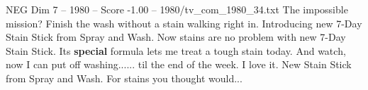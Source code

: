 \begin{textsample}{NEG Dim 7 – 1980 – Score -1.00 – 1980/tv\_com\_1980\_34.txt}  \label{ex:f7_neg_050}
The impossible mission?
Finish the wash without a stain walking right in.
Introducing new 7-Day Stain Stick from Spray and Wash.
Now stains are no problem with new 7-Day Stain Stick.
Its \textbf{special} formula lets me treat a tough stain today.
And watch, now I can put off washing...... til the end of the week.
I love it.
New Stain Stick from Spray and Wash.
For stains you thought would...

\end{textsample}
